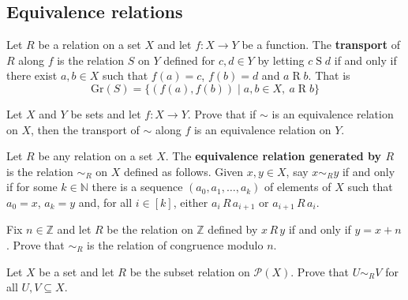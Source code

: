 
\subsection*{Equivalence relations}

\begin{definition}
\label{defTransportOfRelation}
Let $R$ be a relation on a set $X$ and let $f : X \to Y$ be a function. The \textbf{transport} of $R$ along $f$ is the relation $S$ on $Y$ defined for $c,d \in Y$ by letting $c \mathrel{S} d$ if and only if there exist $a,b \in X$ such that $f(a)=c$, $f(b)=d$ and $a \mathrel{R} b$. That is
\[ \mathrm{Gr}(S) = \{ (f(a), f(b)) \mid a,b \in X,~ a \mathrel{R} b \} \]
\end{definition}

\begin{chapex}
Let $X$ and $Y$ be sets and let $f : X \to Y$. Prove that if $\sim$ is an equivalence relation on $X$, then the transport of $\sim$ along $f$ is an equivalence relation on $Y$.
\end{chapex}

\begin{definition}
\label{defEquivalenceRelationGeneratedByRelation}
Let $R$ be any relation on a set $X$. The \textbf{equivalence relation generated by $R$} is the relation ${\sim}_R$ on $X$ defined as follows. Given $x,y \in X$, say $x \sim_R y$ if and only if for some $k \in \mathbb{N}$ there is a sequence $(a_0, a_1, \dots, a_k)$ of elements of $X$ such that $a_0=x$, $a_k=y$ and, for all $i \in [k]$, either $a_i\,R\,a_{i+1}$ or $a_{i+1}\,R\,a_i$.
\end{definition}

\begin{chapex}
\label{cqEquivalenceRelationGeneratedByRelationBegin}
Fix $n \in \mathbb{Z}$ and let $R$ be the relation on $\mathbb{Z}$ defined by $x\,R\,y$ if and only if $y=x+n$. Prove that ${\sim}_R$ is the relation of congruence modulo $n$.
\end{chapex}

\begin{chapex}
Let $X$ be a set and let $R$ be the subset relation on $\mathcal{P}(X)$. Prove that $U \mathrel{{\sim}_R} V$ for all $U, V \subseteq X$.
\end{chapex}

